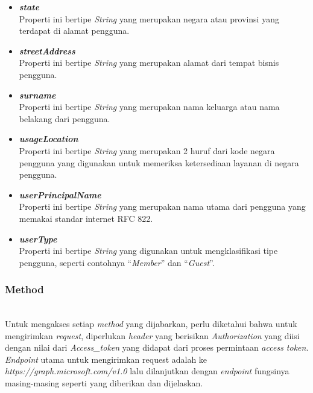 \begin{itemize}
	\item \textbf{\textit{state}}\\
	Properti ini bertipe \textit{String} yang merupakan negara atau provinsi yang terdapat di alamat pengguna. 
	\item \textbf{\textit{streetAddress}}\\
	Properti ini bertipe \textit{String} yang merupakan alamat dari tempat bisnis pengguna.
	\item \textbf{\textit{surname}}\\
	Properti ini bertipe \textit{String} yang merupakan nama keluarga atau nama belakang dari pengguna.  
	\item \textbf{\textit{usageLocation}}\\
	Properti ini bertipe \textit{String} yang merupakan 2 huruf dari kode negara pengguna yang digunakan untuk memeriksa ketersediaan layanan di negara pengguna. 
	\item \textbf{\textit{userPrincipalName}}\\
	Properti ini bertipe \textit{String} yang merupakan nama utama dari pengguna yang memakai standar internet RFC 822.
	\item \textbf{\textit{userType}}\\
	Properti ini bertipe \textit{String} yang digunakan untuk mengklasifikasi tipe pengguna, seperti contohnya ``\textit{Member}'' dan ``\textit{Guest}''.	 
\end{itemize}

\subsubsection{Method}\\
Untuk mengakses setiap \textit{method} yang dijabarkan, perlu diketahui bahwa untuk mengirimkan \textit{request}, diperlukan \textit{header} yang berisikan \textit{Authorization} yang diisi dengan nilai dari \textit{Access\_token} yang didapat dari proses permintaan \textit{access token}. \textit{Endpoint} utama untuk mengirimkan request adalah ke \textit{https://graph.microsoft.com/v1.0} lalu dilanjutkan dengan \textit{endpoint} fungsinya masing-masing seperti yang diberikan dan dijelaskan. 

